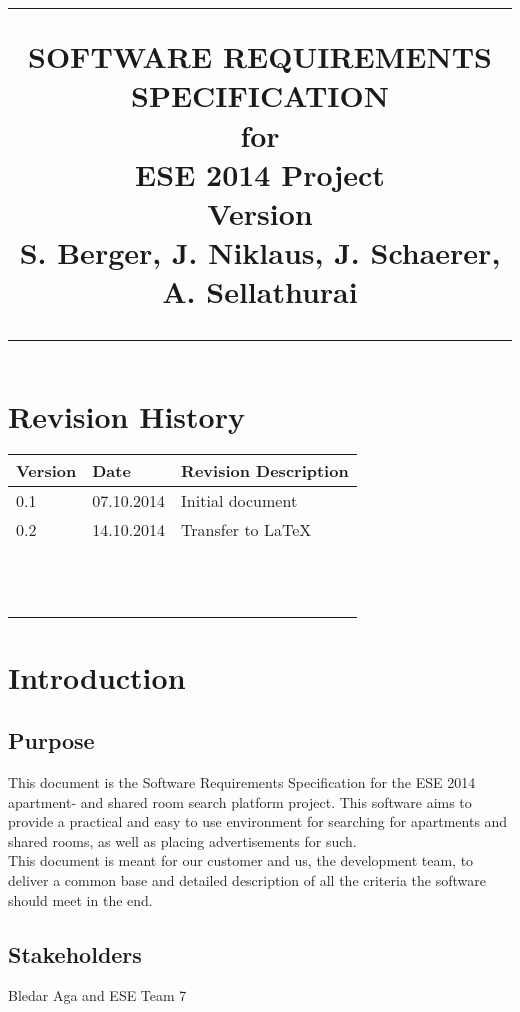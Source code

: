 \documentclass{scrreprt}
\title{%
\flushright
\rule{16cm}{5pt}\vskip1cm
\Huge{SOFTWARE REQUIREMENTS\\ SPECIFICATION}\\
\vspace{2cm}
for\\
\vspace{2cm}
ESE 2014 Project\\
\vspace{2cm}
\LARGE{Version \myversion \\}
\vspace{2cm}
S. Berger, J. Niklaus, J. Schaerer, A. Sellathurai \\
\vfill
\rule{16cm}{5pt}
}
\date{}
\begin{document}
\maketitle
\tableofcontents
\chapter*{Revision History}

\begin{tabular}{|l|l| p{10cm}|}
\hline 
\textbf{Version} & \textbf{Date} & \textbf{Revision Description} \\ 
\hline 
0.1 & 07.10.2014 & Initial document \\ 
\hline 
0.2 & 14.10.2014 & Transfer to LaTeX  \\ 
\hline 
&  &  \\ 
\hline 
&   & \\ 
\hline 
&  &  \\ 
\hline 
&   & \\ 
\hline 
&  &  \\ 
\hline 
&   & \\ 
\hline 
&  &  \\ 
\hline 
&   & \\ 
\hline 
&  &  \\ 
\hline 
&   & \\ 
\hline 
&  &  \\ 
\hline 
&   & \\ 
\hline 
\end{tabular} 


\chapter{Introduction}
\section{Purpose}
This document is the Software Requirements Specification for the ESE 2014 apartment- and shared room search platform project. This software aims to provide a practical and easy to use environment for searching for apartments and shared rooms, as well as placing advertisements for such. \\
This document is meant for our customer and us, the development team, to deliver a common base and detailed description of all the criteria the software should meet in the end. 
\section{Stakeholders}
Bledar Aga and ESE Team 7
\end{document}
